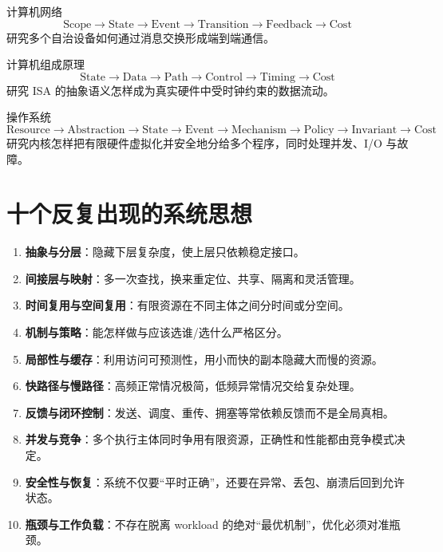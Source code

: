 \documentclass[11pt,a4paper,openany]{ctexbook}
\newcommand{\key}[1]{\textbf{\color{deep}#1}}
\begin{document}
\begin{corebox}{计算机网络}
\[
\boxed{\text{Scope}\rightarrow\text{State}\rightarrow\text{Event}\rightarrow\text{Transition}\rightarrow\text{Feedback}\rightarrow\text{Cost}}
\]
研究多个自治设备如何通过消息交换形成端到端通信。
\end{corebox}

\begin{corebox}{计算机组成原理}
\[
\boxed{\text{State}\rightarrow\text{Data}\rightarrow\text{Path}\rightarrow\text{Control}\rightarrow\text{Timing}\rightarrow\text{Cost}}
\]
研究 ISA 的抽象语义怎样成为真实硬件中受时钟约束的数据流动。
\end{corebox}

\begin{corebox}{操作系统}
\[
\boxed{\text{Resource}\rightarrow\text{Abstraction}\rightarrow\text{State}\rightarrow\text{Event}\rightarrow\text{Mechanism}\rightarrow\text{Policy}\rightarrow\text{Invariant}\rightarrow\text{Cost}}
\]
研究内核怎样把有限硬件虚拟化并安全地分给多个程序，同时处理并发、I/O 与故障。
\end{corebox}

\section{十个反复出现的系统思想}
\begin{enumerate}
  \item \key{抽象与分层}：隐藏下层复杂度，使上层只依赖稳定接口。
  \item \key{间接层与映射}：多一次查找，换来重定位、共享、隔离和灵活管理。
  \item \key{时间复用与空间复用}：有限资源在不同主体之间分时间或分空间。
  \item \key{机制与策略}：能怎样做与应该选谁/选什么严格区分。
  \item \key{局部性与缓存}：利用访问可预测性，用小而快的副本隐藏大而慢的资源。
  \item \key{快路径与慢路径}：高频正常情况极简，低频异常情况交给复杂处理。
  \item \key{反馈与闭环控制}：发送、调度、重传、拥塞等常依赖反馈而不是全局真相。
  \item \key{并发与竞争}：多个执行主体同时争用有限资源，正确性和性能都由竞争模式决定。
  \item \key{安全性与恢复}：系统不仅要“平时正确”，还要在异常、丢包、崩溃后回到允许状态。
  \item \key{瓶颈与工作负载}：不存在脱离 workload 的绝对“最优机制”，优化必须对准瓶颈。
\end{enumerate}
\end{document}

